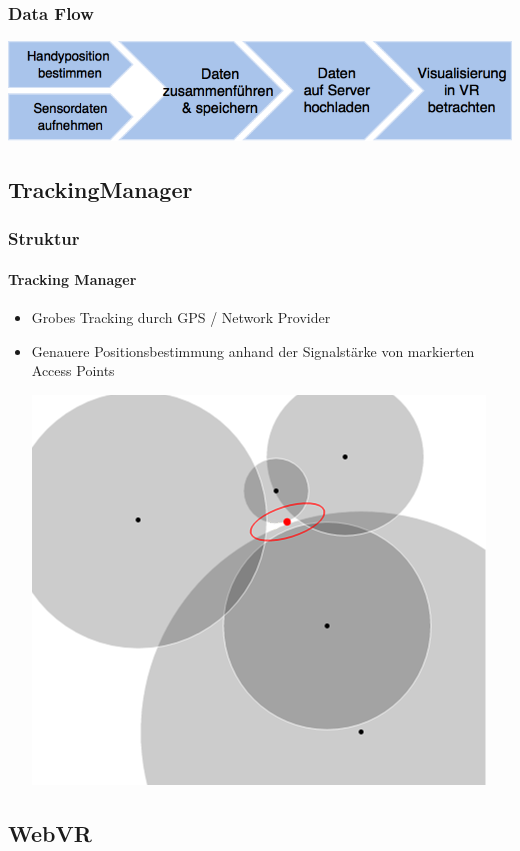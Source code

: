 \documentclass{beamer}
\begin{document}
\begin{frame}
\frametitle{Data Flow}
\begin{center}
	\includegraphics[width=\textwidth]{diagram/dataflow.png}
\end{center}
\end{frame}




\subsection{TrackingManager}

\begin{frame}
\frametitle{Struktur}
\framesubtitle{Tracking Manager}
\begin{itemize}
  	\item	Grobes Tracking durch GPS / Network Provider \pause
 	\item 	Genauere Positionsbestimmung anhand der Signalstärke von markierten Access Points
			\begin{center}
			\includegraphics[scale=0.5]{trilateration.png}
			\end{center}
\end{itemize}
\end{frame}

\subsection{WebVR}
\end{document}
